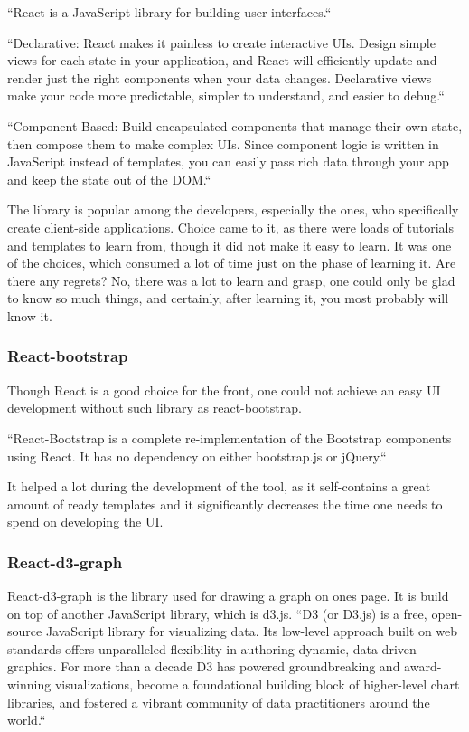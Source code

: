 ``React is a JavaScript library for building user interfaces.``~\cite{react-github}

``Declarative: React makes it painless to create interactive UIs. Design simple views for each state in your application, and React will efficiently update and render just the right components when your data changes. Declarative views make your code more predictable, simpler to understand, and easier to debug.``~\cite{react-github}

``Component-Based: Build encapsulated components that manage their own state, then compose them to make complex UIs. Since component logic is written in JavaScript instead of templates, you can easily pass rich data through your app and keep the state out of the DOM.``~\cite{react-github}

The library is popular among the developers, especially the ones, who specifically create client-side applications. Choice came to it, as there were loads of tutorials and templates to learn from, though it did not make it easy to learn. It was one of the choices, which consumed a lot of time just on the phase of learning it. Are there any regrets? No, there was a lot to learn and grasp, one could only be glad to know so much things, and certainly, after learning it, you most probably will know it.

\subsubsection{React-bootstrap}

Though React is a good choice for the front, one could not achieve an easy UI development without such library as react-bootstrap.

``React-Bootstrap is a complete re-implementation of the Bootstrap components using React. It has no dependency on either bootstrap.js or jQuery.``~\cite{react-bootstrap}

It helped a lot during the development of the tool, as it self-contains a great amount of ready templates and it significantly decreases the time one needs to spend on developing the UI.

\subsubsection{React-d3-graph}

React-d3-graph is the library used for drawing a graph on ones page. It is build on top of another JavaScript library, which is d3.js. ``D3 (or D3.js) is a free, open-source JavaScript library for visualizing data. Its low-level approach built on web standards offers unparalleled flexibility in authoring dynamic, data-driven graphics. For more than a decade D3 has powered groundbreaking and award-winning visualizations, become a foundational building block of higher-level chart libraries, and fostered a vibrant community of data practitioners around the world.``~\cite{d3-js} 

